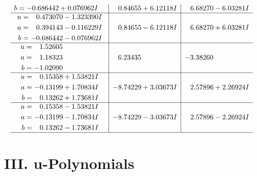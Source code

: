 \documentclass[1p]{elsarticle_modified}
\theoremstyle{definition}
\begin{document}
$$\begin{array}{c|c|c}
\begin{aligned}
b &= -0.686442 + 0.076962 I\end{aligned}
 & \phantom{-}0.84655 + 6.12118 I & \phantom{-}6.68270 - 6.03281 I \\ \hline\begin{aligned}
u &= \phantom{-}0.473070 - 1.323390 I \\
a &= \phantom{-}0.394143 - 0.116229 I \\
b &= -0.686442 - 0.076962 I\end{aligned}
 & \phantom{-}0.84655 - 6.12118 I & \phantom{-}6.68270 + 6.03281 I \\ \hline\begin{aligned}
u &= \phantom{-}1.52605\phantom{ +0.000000I} \\
a &= \phantom{-}1.18323\phantom{ +0.000000I} \\
b &= -1.02090\phantom{ +0.000000I}\end{aligned}
 & \phantom{-}6.23435\phantom{ +0.000000I} & -3.38260\phantom{ +0.000000I} \\ \hline\begin{aligned}
u &= \phantom{-}0.15358 + 1.53821 I \\
a &= -0.13199 + 1.70834 I \\
b &= \phantom{-}0.13262 + 1.73681 I\end{aligned}
 & -8.74229 + 3.03673 I & \phantom{-}2.57896 + 2.26924 I \\ \hline\begin{aligned}
u &= \phantom{-}0.15358 - 1.53821 I \\
a &= -0.13199 - 1.70834 I \\
b &= \phantom{-}0.13262 - 1.73681 I\end{aligned}
 & -8.74229 - 3.03673 I & \phantom{-}2.57896 - 2.26924 I\\
 \hline 
 \end{array}$$\newpage
\newpage\renewcommand{\arraystretch}{1}
\centering \section*{ III. u-Polynomials}
\end{document}
